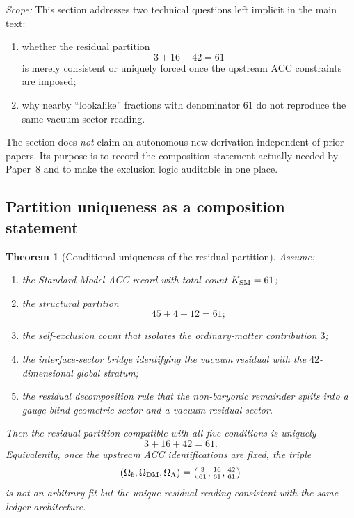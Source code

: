 \documentclass[11pt]{article}
\theoremstyle{plain}
\newtheorem{theorem}{Theorem}[section]
\theoremstyle{definition}
\theoremstyle{remark}
\begin{document}
\noindent\textit{Scope:} This section addresses two technical questions left implicit in the main text:
\begin{enumerate}[leftmargin=2.5em,label=\textup{(\roman*)}]
  \item whether the residual partition
  \[
    3 + 16 + 42 = 61
  \]
  is merely consistent or uniquely forced once the upstream ACC constraints are imposed;
  \item why nearby ``lookalike'' fractions with denominator $61$ do not reproduce the same vacuum-sector reading.
\end{enumerate}
The section does \emph{not} claim an autonomous new derivation independent of prior papers.  Its purpose is to record the composition statement actually needed by Paper~8 and to make the exclusion logic auditable in one place.

\bigskip

\subsection{Partition uniqueness as a composition statement}\label{supp:I1}

\begin{theorem}[Conditional uniqueness of the residual partition]\label{thm:partition_uniqueness}
Assume:
\begin{enumerate}[leftmargin=2.5em,label=\textup{(\roman*)}]
  \item the Standard-Model ACC record with total count $K_{\rm SM} = 61$;
  \item the structural partition
  \[
    45 + 4 + 12 = 61;
  \]
  \item the self-exclusion count that isolates the ordinary-matter contribution $3$;
  \item the interface-sector bridge identifying the vacuum residual with the $42$-dimensional global stratum;
  \item the residual decomposition rule that the non-baryonic remainder splits into a gauge-blind geometric sector and a vacuum-residual sector.
\end{enumerate}
Then the residual partition compatible with all five conditions is uniquely
\[
  3 + 16 + 42 = 61.
\]
Equivalently, once the upstream ACC identifications are fixed, the triple
\[
  (\Omega_b, \Omega_{\rm DM}, \Omega_\Lambda) = \left(\tfrac{3}{61}, \tfrac{16}{61}, \tfrac{42}{61}\right)
\]
is not an arbitrary fit but the unique residual reading consistent with the same ledger architecture.
\end{theorem}
\end{document}
